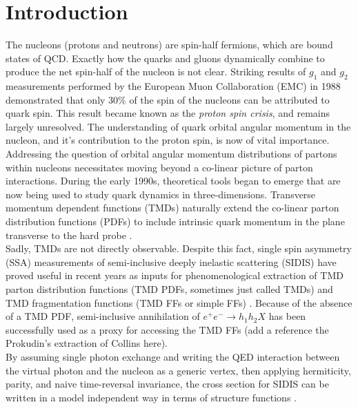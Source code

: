 \chapter{Introduction}

The nucleons (protons and neutrons) are spin-half fermions, which are bound states of QCD.  Exactly how the quarks and gluons dynamically combine to produce the net spin-half of the nucleon is not clear.  Striking results of $g_1$ and $g_2$ measurements performed by the European Muon Collaboration (EMC) in 1988 \cite{pdfs-leader:1988} demonstrated that only $30\%$ of the spin of the nucleons can be attributed to quark spin.  This result became known as the \textit{proton spin crisis}, and remains largely unresolved.  The understanding of quark orbital angular momentum in the nucleon, and it's contribution to the proton spin, is now of vital importance.  \\

Addressing the question of orbital angular momentum distributions of partons within nucleons necessitates moving beyond a co-linear picture of parton interactions.   During the early 1990s, theoretical tools began to emerge that are now being used to study quark dynamics in three-dimensions.  Transverse momentum dependent functions (TMDs) naturally extend the co-linear parton distribution functions (PDFs) to include intrinsic quark momentum in the plane transverse to the hard probe \cite{tmds-mulders:1995, tmds-bacchetta:2006}.  \\

Sadly, TMDs are not directly observable.  Despite this fact, single spin asymmetry (SSA) measurements of semi-inclusive deeply inelastic scattering (SIDIS) have proved useful in recent years as inputs for phenomenological extraction of TMD parton distribution functions (TMD PDFs, sometimes just called TMDs) and TMD fragmentation functions (TMD FFs or simple FFs) \cite{tmds-airapetian:2009, tmds-airapetian:2012, tmds-aghasyan:2017}.  Because of the absence of a TMD PDF, semi-inclusive annihilation of $e^+ e^- \rightarrow h_1 h_2 X$ has been successfully used as a proxy for accessing the TMD FFs (add a reference the Prokudin's extraction of Collins here).  \\

By assuming single photon exchange and writing the QED interaction between the virtual photon and the nucleon as a generic vertex, then applying hermiticity, parity, and naive time-reversal invariance, the cross section for SIDIS can be written in a model independent way in terms of structure functions \cite{tmds-mulders:1995, tmds-bacchetta:2006}.  

